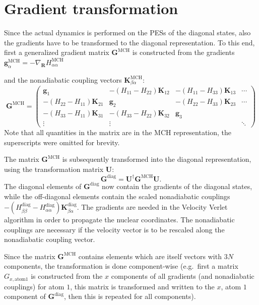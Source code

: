 \documentclass[a4paper,10pt,DIV=15,openany,twoside=false]{scrbook}
\newcommand{\tthdump}[1]{#1}
\newcommand{\VEC}[1]{\ensuremath{\mathbf{#1}}}
\begin{document}
\section{Gradient transformation}\label{met:gradtra}

Since the actual dynamics is performed on the PESs of the diagonal states, also the gradients have to be transformed to the diagonal representation. To this end, first a generalized gradient matrix $\VEC{G}^{\text{MCH}}$ is constructed from the gradients %
\tthdump{%
$\VEC{g}^{\text{MCH}}_\alpha=-\nabla_\VEC{R}H_{\alpha\alpha}^{\text{MCH}}$%
}
and the nonadiabatic coupling vectors 
$\VEC{K}_{\beta\alpha}^{\text{MCH}}$:
\begin{equation}
  \VEC{G}^{\text{MCH}}=
  \begin{pmatrix}
    \VEC{g}_1   &-(H_{11}-H_{22})\VEC{K}_{12} &-(H_{11}-H_{33})\VEC{K}_{13} &\cdots\\
    -(H_{22}-H_{11})\VEC{K}_{21}      &\VEC{g}_2      &-(H_{22}-H_{33})\VEC{K}_{23}&\cdots\\
    -(H_{33}-H_{11})\VEC{K}_{31}      &-(H_{33}-H_{22})\VEC{K}_{32} &\VEC{g}_3\\
    \vdots      &\vdots         &       &\ddots
  \end{pmatrix}
\end{equation}
Note that all quantities in the matrix are in the MCH representation, the superscripts were omitted for brevity.

The matrix $\VEC{G}^{\text{MCH}}$ is subsequently transformed into the diagonal representation, using the transformation matrix $\VEC{U}$:
\begin{equation}
  \VEC{G}^{\text{diag}}=\VEC{U}^\dagger\VEC{G}^{\text{MCH}}\VEC{U}.
\end{equation}
The diagonal elements of $\VEC{G}^{\text{diag}}$ now contain the gradients of the diagonal states, while the off-diagonal elements contain the scaled nonadiabatic couplings $-(H^{\text{diag}}_{\beta\beta}-H^{\text{diag}}_{\alpha\alpha})\VEC{K}_{\beta\alpha}^{\text{diag}}$. The gradients are needed in the Velocity Verlet algorithm in order to propagate the nuclear coordinates. The nonadiabatic couplings are necessary if the velocity vector is to be rescaled along the nonadiabatic coupling vector.

Since the matrix $\VEC{G}^{\text{MCH}}$ contains elements which are itself vectors with $3N$ components, the transformation is done component-wise (e.g.\ first a matrix $G_{x,\text{atom} 1}$ is constructed from the $x$ components of all gradients (and nonadiabatic couplings) for atom $1$, this matrix is transformed and written to the $x$, atom $1$ component of $\VEC{G}^{\text{diag}}$, then this is repeated for all components).
\end{document}
